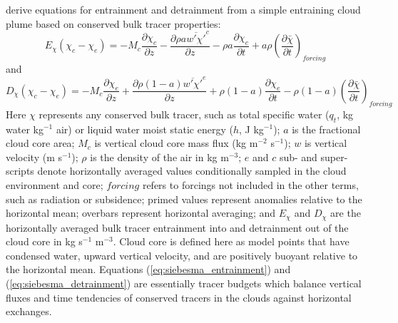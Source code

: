 \documentclass[draft,grl]{agutex}
\begin{document}
\begin{article}
\cite{Siebesma1995} derive equations for entrainment and detrainment from a 
simple entraining cloud plume based on conserved bulk tracer properties:
\begin{equation}
  \label{eq:siebesma_entrainment}
    E_{\chi}(\chi_c - \chi_e) = - M_c \frac{\partial \chi_c}{\partial z}
        - \frac{\partial \rho a \overline{w' \chi'}^c}{\partial z}
        - \rho a \frac{\partial \chi_c}{\partial t}
        + a \rho \left(\frac{\partial \bar{\chi}}{\partial t}\right)_{forcing}
\end{equation}
and
\begin{equation}
  \label{eq:siebesma_detrainment}
    D_{\chi}(\chi_c - \chi_e) = - M_c \frac{\partial \chi_e}{\partial z}
        + \frac{\partial \rho (1 - a) \overline{w' \chi'}^e}{\partial z}
        + \rho (1-a) \frac{\partial \chi_e}{\partial t}
     - \rho (1-a) \left(\frac{\partial \bar{\chi}}{\partial t}\right)_{forcing}
\end{equation}
Here $\chi$ represents any conserved bulk tracer, such as total specific water 
($q_t$, kg water kg$^{-1}$ air) or liquid water moist static energy 
($h$, J kg$^{-1}$); $a$ is the fractional cloud core area; $M_c$ is vertical 
cloud core mass flux (kg m$^{-2}$ s$^{-1}$); $w$ is vertical velocity 
(m s$^{-1}$); $\rho$ is the density of the air in kg m$^{-3}$; $e$ and $c$ 
sub- and super-scripts denote horizontally averaged values conditionally 
sampled in the cloud environment and core; $forcing$ refers to forcings not 
included in the other terms, such as radiation or subsidence; primed values 
represent anomalies relative to the horizontal mean; overbars represent 
horizontal averaging; and $E_{\chi}$ and $D_{\chi}$ are the horizontally 
averaged bulk tracer entrainment into and detrainment out of the cloud core 
in kg s$^{-1}$ m$^{-3}$.  Cloud core is defined here as model points that have 
condensed water, upward vertical velocity, and are positively buoyant relative 
to the horizontal mean.  Equations (\ref{eq:siebesma_entrainment}) and 
(\ref{eq:siebesma_detrainment}) are essentially tracer budgets which balance 
vertical fluxes and time tendencies of conserved tracers in the clouds against 
horizontal exchanges.


\end{article}
\end{document}
